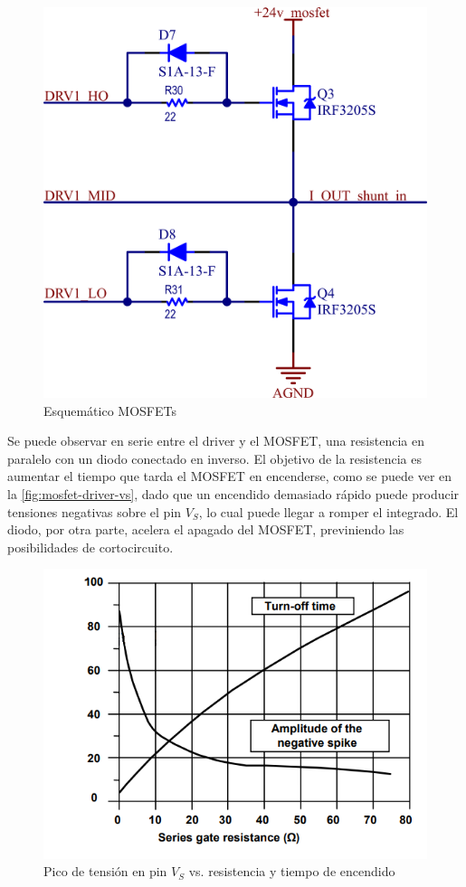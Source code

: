 \documentclass[titlepage, 12pt]{article}
\begin{document}
    \begin{figure}[!htbp]
        \centering
        \includegraphics[scale=1.5]{images/mosfet.png}
        \caption{Esquemático MOSFETs}
        \label{fig:mosfet}
    \end{figure}


Se puede observar en serie entre el driver y el MOSFET, una resistencia en paralelo con un diodo conectado en inverso. El objetivo de la resistencia es aumentar el tiempo que tarda el MOSFET en encenderse, como se puede ver en la \autoref{fig:mosfet-driver-vs}, dado que un encendido demasiado rápido puede producir tensiones negativas sobre el pin $V_S$, lo cual puede llegar a romper el integrado. El diodo, por otra parte, acelera el apagado del MOSFET, previniendo las posibilidades de cortocircuito.

    \begin{figure}[!htbp]
        \centering
        \includegraphics[scale=0.5]{images/mosfet-driver-vs.png}
        \caption{Pico de tensión en pin $V_S$ vs. resistencia y tiempo de encendido}
        \label{fig:mosfet-driver-vs}
    \end{figure}
\end{document}
